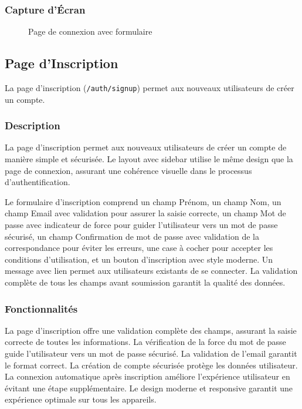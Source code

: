 \documentclass[12pt,a4paper]{article}
\begin{document}
\subsubsection{Capture d'Écran}

\begin{figure}[H]
    \centering
    \caption{Page de connexion avec formulaire}
    \label{fig:login}
\end{figure}

\subsection{Page d'Inscription}

La page d'inscription (\texttt{/auth/signup}) permet aux nouveaux utilisateurs de créer un compte.

\subsubsection{Description}

La page d'inscription permet aux nouveaux utilisateurs de créer un compte de manière simple et sécurisée. Le layout avec sidebar utilise le même design que la page de connexion, assurant une cohérence visuelle dans le processus d'authentification.

Le formulaire d'inscription comprend un champ Prénom, un champ Nom, un champ Email avec validation pour assurer la saisie correcte, un champ Mot de passe avec indicateur de force pour guider l'utilisateur vers un mot de passe sécurisé, un champ Confirmation de mot de passe avec validation de la correspondance pour éviter les erreurs, une case à cocher pour accepter les conditions d'utilisation, et un bouton d'inscription avec style moderne. Un message avec lien permet aux utilisateurs existants de se connecter. La validation complète de tous les champs avant soumission garantit la qualité des données.

\subsubsection{Fonctionnalités}

La page d'inscription offre une validation complète des champs, assurant la saisie correcte de toutes les informations. La vérification de la force du mot de passe guide l'utilisateur vers un mot de passe sécurisé. La validation de l'email garantit le format correct. La création de compte sécurisée protège les données utilisateur. La connexion automatique après inscription améliore l'expérience utilisateur en évitant une étape supplémentaire. Le design moderne et responsive garantit une expérience optimale sur tous les appareils.
\end{document}
